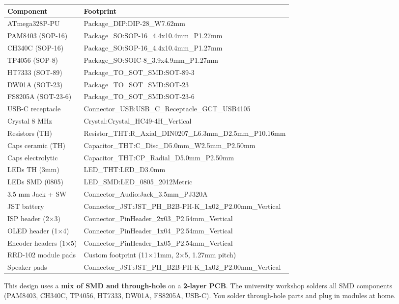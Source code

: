 \documentclass[a4paper,11pt]{article}
\renewcommand*{\,}{ }%
\begin{document}
\begin{longtable}{@{}p{4cm}p{8cm}@{}}
\toprule
\textbf{Component} & \textbf{Footprint} \\
\midrule
\endhead
ATmega328P-PU & Package\_DIP:DIP-28\_W7.62mm \\
PAM8403 (SOP-16) & Package\_SO:SOP-16\_4.4x10.4mm\_P1.27mm \\
CH340C (SOP-16) & Package\_SO:SOP-16\_4.4x10.4mm\_P1.27mm \\
TP4056 (SOP-8) & Package\_SO:SOIC-8\_3.9x4.9mm\_P1.27mm \\
HT7333 (SOT-89) & Package\_TO\_SOT\_SMD:SOT-89-3 \\
DW01A (SOT-23) & Package\_TO\_SOT\_SMD:SOT-23 \\
FS8205A (SOT-23-6) & Package\_TO\_SOT\_SMD:SOT-23-6 \\
USB-C receptacle & Connector\_USB:USB\_C\_Receptacle\_GCT\_USB4105 \\
Crystal 8\,MHz & Crystal:Crystal\_HC49-4H\_Vertical \\
Resistors (TH) & Resistor\_THT:R\_Axial\_DIN0207\_L6.3mm\_D2.5mm\_P10.16mm \\
Caps ceramic (TH) & Capacitor\_THT:C\_Disc\_D5.0mm\_W2.5mm\_P2.50mm \\
Caps electrolytic & Capacitor\_THT:CP\_Radial\_D5.0mm\_P2.50mm \\
LEDs TH (3mm) & LED\_THT:LED\_D3.0mm \\
LEDs SMD (0805) & LED\_SMD:LED\_0805\_2012Metric \\
3.5\,mm Jack + SW & Connector\_Audio:Jack\_3.5mm\_PJ320A \\
JST battery & Connector\_JST:JST\_PH\_B2B-PH-K\_1x02\_P2.00mm\_Vertical \\
ISP header (2$\times$3) & Connector\_PinHeader\_2x03\_P2.54mm\_Vertical \\
OLED header (1$\times$4) & Connector\_PinHeader\_1x04\_P2.54mm\_Vertical \\
Encoder headers (1$\times$5) & Connector\_PinHeader\_1x05\_P2.54mm\_Vertical \\
RRD-102 module pads & Custom footprint (11$\times$11mm, 2$\times$5, 1.27mm pitch) \\
Speaker pads & Connector\_JST:JST\_PH\_B2B-PH-K\_1x02\_P2.00mm\_Vertical \\
\bottomrule
\end{longtable}

\begin{infobox}
This design uses a \textbf{mix of SMD and through-hole} on a \textbf{2-layer PCB}. The university workshop solders all SMD components (PAM8403, CH340C, TP4056, HT7333, DW01A, FS8205A, USB-C). You solder through-hole parts and plug in modules at home.
\end{infobox}
\end{document}
